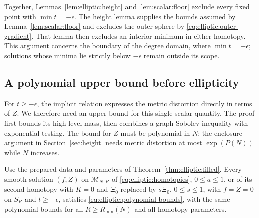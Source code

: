 Together, Lemmas~\ref{lem:elliptic:height} and
\ref{lem:scalar:floor} exclude every fixed point with
$\min t=-\epsilon$.  The height lemma supplies the bounds assumed by
Lemma~\ref{lem:scalar:floor} and excludes the outer sphere by
\eqref{eq:elliptic:outer-gradient}.  That lemma
then excludes an interior minimum in either homotopy.  This argument
concerns the boundary of the degree domain, where $\min t=-\epsilon$;
solutions whose minima lie strictly below $-\epsilon$ remain outside its scope.

\subsection{A polynomial upper bound before ellipticity}

For $t\ge-\epsilon$, the implicit relation expresses the metric distortion
directly in terms of $Z$.  We therefore need an upper bound for this
single scalar quantity.  The proof first bounds its high-level mass,
then combines a graph Sobolev inequality with exponential testing.
The bound for $Z$ must be polynomial in $N$: the enclosure argument
in Section~\ref{sec:height} needs metric distortion at most
$\exp(P(N))$ while $N$ increases.

\begin{proposition}\label{prop:elliptic:upper}
Use the prepared data and parameters of Theorem~\ref{thm:elliptic:filled}.
Every smooth solution $(f,Z)$ on $\mathcal M_{N,R}$ of
\eqref{eq:elliptic:homotopies}, $0\le a\le1$, or of its second
homotopy with $K=0$ and $\Xi_0$ replaced by $s\Xi_0$, $0\le s\le1$, with
$f=Z=0$ on $S_R$ and $t\ge-\epsilon$, satisfies
\eqref{eq:elliptic:polynomial-bounds}, with the same polynomial bounds
for all $R\ge R_{\min}(N)$ and all homotopy parameters.
\end{proposition}

